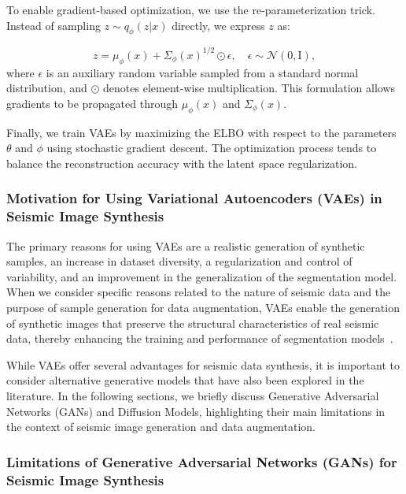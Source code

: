 \documentclass{ieeeaccess}
\begin{document}
To enable gradient-based optimization, we use the re-parameterization trick. Instead of sampling $z \sim q_\phi(z | x)$ directly, we express $z$ as:

\begin{equation}
z = \mu_\phi(x) + \Sigma_\phi(x)^{1/2} \odot \epsilon, \quad \epsilon \sim \mathcal{N}(0, \mathrm{I}),
\end{equation}
where $\epsilon$ is an auxiliary random variable sampled from a standard normal distribution, and $\odot$ denotes element-wise multiplication. This formulation allows gradients to be propagated through $\mu_\phi(x)$ and $\Sigma_\phi(x)$.

Finally, we train VAEs by maximizing the ELBO with respect to the parameters $\theta$ and $\phi$ using stochastic gradient descent. The optimization process tends to balance the reconstruction accuracy with the latent space regularization.


\subsubsection{Motivation for Using Variational Autoencoders (VAEs) in Seismic Image Synthesis}

The primary reasons for using VAEs are a realistic generation of synthetic samples, an increase in dataset diversity, a regularization and control of variability, and an improvement in the generalization of the segmentation model. When we consider specific reasons related to the nature of seismic data and the purpose of sample generation for data augmentation, VAEs enable the generation of synthetic images that preserve the structural characteristics of real seismic data, thereby enhancing the training and performance of segmentation models~\cite{Henriques2021,Wang2021,Anjom2024}.

While VAEs offer several advantages for seismic data synthesis, it is important to consider alternative generative models that have also been explored in the literature. In the following sections, we briefly discuss Generative Adversarial Networks (GANs) and Diffusion Models, highlighting their main limitations in the context of seismic image generation and data augmentation.

\subsubsection{Limitations of Generative Adversarial Networks (GANs) for Seismic Image Synthesis}
\end{document}
